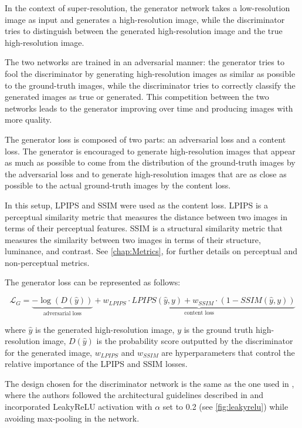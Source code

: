 In the context of super-resolution, the generator network takes a low-resolution image as input and generates a high-resolution image, while the discriminator tries to distinguish between the generated high-resolution image and the true high-resolution image.

The two networks are trained in an adversarial manner: the generator tries to fool the discriminator by generating high-resolution images as similar as possible to the ground-truth images, while the discriminator tries to correctly classify the generated images as true or generated. This competition between the two networks leads to the generator improving over time and producing images with more quality.

The generator loss is composed of two parts: an adversarial loss and a content loss.
The generator is encouraged to generate high-resolution images that appear as much as possible to come from the distribution of the ground-truth images by the adversarial loss and to generate high-resolution images that are as close as possible to the actual ground-truth images by the content loss.

In this setup, LPIPS and SSIM were used as the content loss. LPIPS is a perceptual similarity metric that measures the distance between two images in terms of their perceptual features. SSIM is a structural similarity metric that measures the similarity between two images in terms of their structure, luminance, and contrast. See \cref{chap:Metrics}, for further details on perceptual and non-perceptual metrics. 

The generator loss can be represented as follows:

$$
    \mathcal{L}_{G} = \underset{
        \text{adversarial loss}
    }{\underbrace{
        -\log(D(\hat{y}))
    }} + \underset{
        \text{content loss}
    }{\underbrace{
        w_{LPIPS}\cdot LPIPS(\hat{y}, y) + w_{SSIM} \cdot (1 - SSIM(\hat{y}, y))
    }}
$$

where $\hat{y}$ is the generated high-resolution image, $y$ is the ground truth high-resolution image, $D(\hat{y})$ is the probability score outputted by the discriminator for the generated image, $w_{LPIPS}$ and $w_{SSIM}$ are hyperparameters that control the relative importance of the LPIPS and SSIM losses.

The design chosen for the discriminator network is the same as the one used in \cite{ledig2017photo}, where the authors followed the architectural guidelines described in \cite{radford2015unsupervised} and incorporated LeakyReLU \cite{maas2013rectifier} activation with $\alpha$ set to 0.2 (see \cref{fig:leakyrelu}) while avoiding max-pooling in the network.

